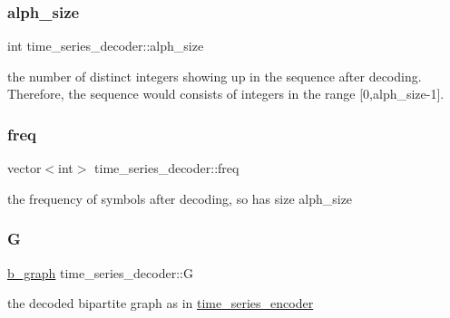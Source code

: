 \subsubsection{\texorpdfstring{alph\+\_\+size}{alph\_size}}
{\footnotesize\ttfamily int time\+\_\+series\+\_\+decoder\+::alph\+\_\+size\hspace{0.3cm}{\ttfamily [private]}}



the number of distinct integers showing up in the sequence after decoding. Therefore, the sequence would consists of integers in the range \mbox{[}0,alph\+\_\+size-\/1\mbox{]}. 

\mbox{\label{classtime__series__decoder_a25875d5879e79eeda27588b9cbcad591}} 
\subsubsection{\texorpdfstring{freq}{freq}}
{\footnotesize\ttfamily vector$<$int$>$ time\+\_\+series\+\_\+decoder\+::freq\hspace{0.3cm}{\ttfamily [private]}}



the frequency of symbols after decoding, so has size alph\+\_\+size 

\mbox{\label{classtime__series__decoder_a66abe50babd1ebe2eb5a130d4b8091f1}} 
\subsubsection{\texorpdfstring{G}{G}}
{\footnotesize\ttfamily \hyperlink{classb__graph}{b\+\_\+graph} time\+\_\+series\+\_\+decoder\+::G\hspace{0.3cm}{\ttfamily [private]}}



the decoded bipartite graph as in {\ttfamily \hyperlink{classtime__series__encoder}{time\+\_\+series\+\_\+encoder}} 

\mbox{\label{classtime__series__decoder_a05f75c42ac2acd63766714e6e09f1a65}} 
